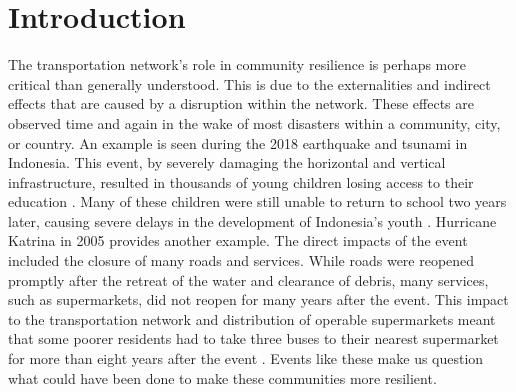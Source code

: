 \documentclass[review,3p,times,onecolumn,sort&compress,12pt]{elsarticle}
\let \cite \parencite
\begin{document}

\section{Introduction}
The transportation network's role in community resilience is perhaps more critical than generally understood.
This is due to the externalities and indirect effects that are caused by a disruption within the network. 
These effects are observed time and again in the wake of most disasters within a community, city, or country.
An example is seen during the 2018 earthquake and tsunami in Indonesia.
This event, by severely damaging the horizontal and vertical infrastructure, resulted in thousands of young children losing access to their education \cite{Claire_Garmirian2019-lv}. 
Many of these children were still unable to return to school two years later, causing severe delays in the development of Indonesia's youth \cite{gibbs2019delayed}.
Hurricane Katrina in 2005 provides another example. 
The direct impacts of the event included the closure of many roads and services.
While roads were reopened promptly after the retreat of the water and clearance of debris, many services, such as supermarkets, did not reopen for many years after the event.
This impact to the transportation network and distribution of operable supermarkets meant that some poorer residents had to take three buses to their nearest supermarket for more than eight years after the event \cite{Netter_2016-zp}.
Events like these make us question what could have been done to make these communities more resilient.
\end{document}
